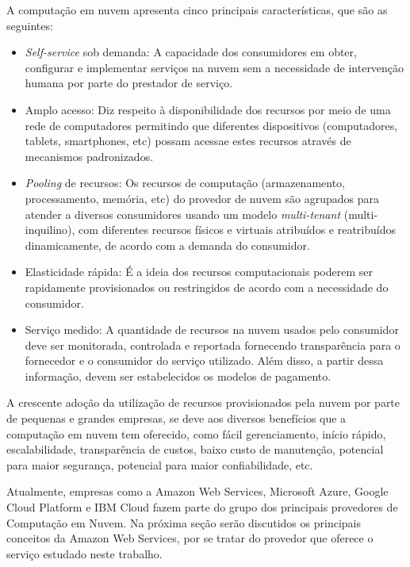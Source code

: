 A computação em nuvem apresenta cinco principais características, que são as seguintes:
\begin{itemize}
    \item \textit{Self-service} sob demanda: A capacidade dos consumidores em obter, configurar e implementar serviços na nuvem sem a necessidade de intervenção humana por parte do prestador de serviço.
    
    \item Amplo acesso: Diz respeito à disponibilidade dos recursos por meio de uma rede de computadores permitindo que diferentes dispositivos (computadores, tablets, smartphones, etc) possam acessae estes recursos através de mecanismos padronizados.   
    
    \item \textit{Pooling} de recursos: Os recursos de computação (armazenamento, processamento, memória, etc) do provedor de nuvem são agrupados para atender a diversos consumidores usando um modelo \textit{multi-tenant} (multi-inquilino), com diferentes recursos físicos e virtuais atribuídos e reatribuídos dinamicamente, de acordo com a demanda do consumidor.
    
    \item Elasticidade rápida: É a ideia dos recursos computacionais poderem ser rapidamente provisionados ou restringidos de acordo com a necessidade do consumidor.
    
    \item Serviço medido: A quantidade de recursos na nuvem usados pelo consumidor deve ser monitorada, controlada e reportada fornecendo transparência para o fornecedor e o consumidor do serviço utilizado.  Além disso, a partir dessa informação, devem ser estabelecidos os modelos de pagamento.

\end{itemize}


A crescente adoção da utilização de recursos provisionados pela nuvem por parte de pequenas e grandes empresas, se deve aos diversos benefícios que a computação em nuvem tem oferecido, como fácil gerenciamento, início rápido, escalabilidade, transparência de custos, baixo custo de manutenção, potencial para maior segurança, potencial para maior confiabilidade, etc. \cite{5942089}

Atualmente, empresas como a Amazon Web Services, Microsoft Azure, Google Cloud Platform e IBM Cloud fazem parte do grupo dos principais provedores de Computação em Nuvem. Na próxima seção serão discutidos os principais conceitos da Amazon Web Services, por se tratar do provedor que oferece o serviço estudado neste trabalho.  

